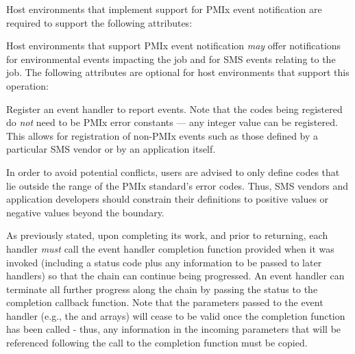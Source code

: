 
\divider

Host environments that implement support for \ac{PMIx} event notification are required to support the following attributes:


\reqattrend

\optattrstart
Host environments that support \ac{PMIx} event notification \textit{may} offer notifications for environmental events impacting the job and for \ac{SMS} events relating to the job. The following attributes are optional for host environments that support this operation:


\optattrend

\descr

Register an event handler to report events. Note that the codes being registered do \textit{not} need to be \ac{PMIx} error constants --- any integer value can be registered. This allows for registration of non-PMIx events such as those defined by a particular \ac{SMS} vendor or by an application itself.

\adviceuserstart
In order to avoid potential conflicts, users are advised to only define codes that lie outside the range of the \ac{PMIx} standard's error codes. Thus, \ac{SMS} vendors and application developers should constrain their definitions to positive values or negative values beyond the  boundary.
\adviceuserend


\adviceuserstart
As previously stated, upon completing its work, and prior to returning, each handler \textit{must} call the event handler completion function provided when it was invoked (including a status code plus any information to be passed to later handlers) so that the chain can continue being progressed. An event handler can terminate all further progress along the chain by passing the  status to the completion callback function. Note that the parameters passed to the event handler (e.g., the  and  arrays) will cease to be valid once the completion function has been called - thus, any information in the incoming parameters that will be referenced following the call to the completion function must be copied.
\adviceuserend

